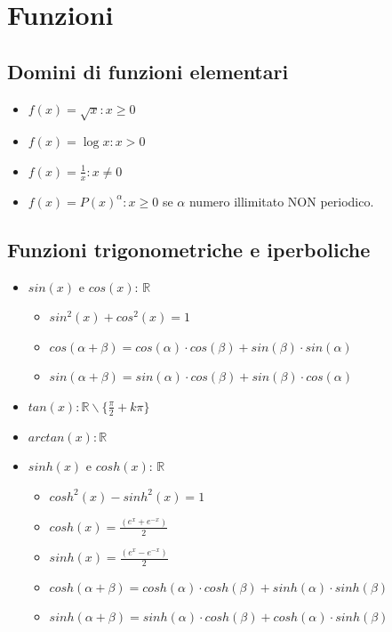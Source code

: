 \section{Funzioni}
\subsection{Domini di funzioni elementari}
\begin{itemize}
    \item $f(x) = \sqrt{x} : x \ge 0$
    \item $f(x) = \log{x} : x > 0$
    \item $f(x) = \frac{1}{x} : x \not = 0$
    \item $f(x) = P(x)^\alpha : x \ge 0$ se $\alpha$ numero illimitato NON periodico.
\end{itemize}

\subsection{Funzioni trigonometriche e iperboliche}
\begin{itemize}
    \item $sin(x)$ e $cos(x)$: $\mathbb{R}$
    \begin{itemize}
        \item $sin^2(x) + cos^2(x) = 1$
        \item $cos(\alpha + \beta) = cos(\alpha)\cdot cos(\beta) + sin(\beta)\cdot sin(\alpha)$
        \item $sin(\alpha + \beta) = sin(\alpha)\cdot cos(\beta) + sin(\beta)\cdot cos(\alpha)$
    \end{itemize}
    \item $tan(x) : \mathbb{R} \backslash \big\{\frac{\pi}{2} + k\pi\big\}$
    \item $arctan(x) : \mathbb{R}$
    \item $sinh(x)$ e $cosh(x)$: $\mathbb{R}$
    \begin{itemize}
        \item $cosh^2(x) - sinh^2(x) = 1$
        \item $cosh(x) = \frac{(e^x + e^{-x})}{2}$
        \item $sinh(x) = \frac{(e^x - e^{-x})}{2}$
        \item $cosh(\alpha + \beta) = cosh(\alpha)\cdot cosh(\beta) + sinh(\alpha)\cdot sinh(\beta)$
        \item $sinh(\alpha + \beta) = sinh(\alpha)\cdot cosh(\beta) + cosh(\alpha)\cdot sinh(\beta)$
    \end{itemize}
\end{itemize}

